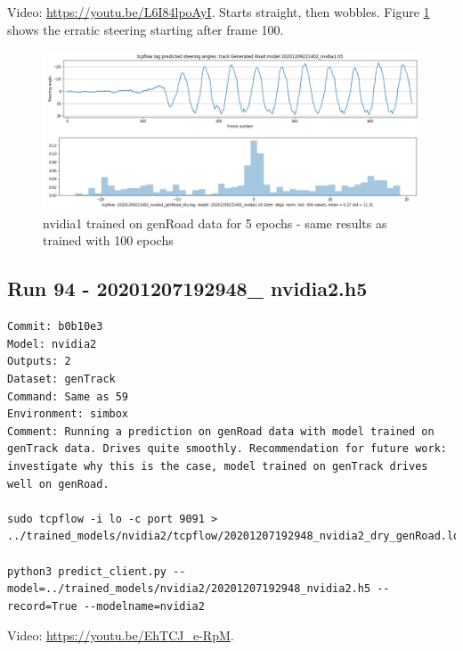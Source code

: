 Video: \url{https://youtu.be/L6I84lpoAyI}. Starts straight, then wobbles. 
Figure \ref{fig:20201209221402_nvidia1_genRoad_dry} shows the erratic steering starting after frame 100.
\begin{figure}[ht]
 \centering 
 \includegraphics[width=\textwidth]{Figures/20201209221402_nvidia1_genRoad_dry.png}
 \caption{nvidia1 trained on genRoad data for 5 epochs - same results as trained with 100 epochs}
 \label{fig:20201209221402_nvidia1_genRoad_dry} 
\end{figure}

\subsection{Run 94 - 20201207192948\_ nvidia2.h5 }
\label{app_res:94}
\begin{verbatim}
Commit: b0b10e3
Model: nvidia2
Outputs: 2 
Dataset: genTrack
Command: Same as 59
Environment: simbox
Comment: Running a prediction on genRoad data with model trained on genTrack data. Drives quite smoothly. Recommendation for future work: investigate why this is the case, model trained on genTrack drives well on genRoad.

sudo tcpflow -i lo -c port 9091 > ../trained_models/nvidia2/tcpflow/20201207192948_nvidia2_dry_genRoad.log

python3 predict_client.py --model=../trained_models/nvidia2/20201207192948_nvidia2.h5 --record=True --modelname=nvidia2

\end{verbatim}
Video: \url{https://youtu.be/EhTCJ_e-RpM}. 

